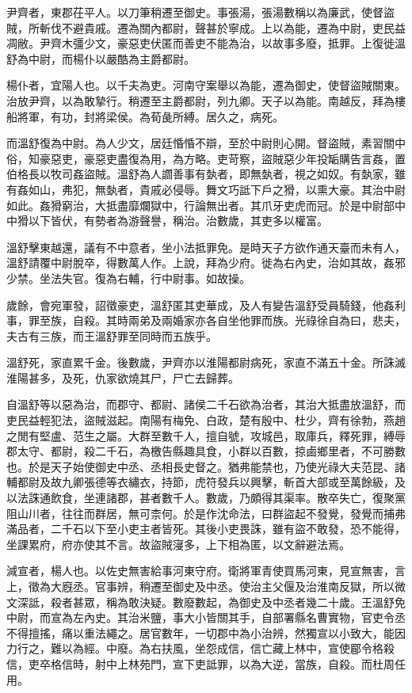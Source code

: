 尹齊者，東郡茌平人。以刀筆稍遷至御史。事張湯，張湯數稱以為廉武，使督盜賊，所斬伐不避貴戚。遷為關內都尉，聲甚於寧成。上以為能，遷為中尉，吏民益凋敝。尹齊木彊少文，豪惡吏伏匿而善吏不能為治，以故事多廢，抵罪。上復徙溫舒為中尉，而楊仆以嚴酷為主爵都尉。

楊仆者，宜陽人也。以千夫為吏。河南守案舉以為能，遷為御史，使督盜賊關東。治放尹齊，以為敢摯行。稍遷至主爵都尉，列九卿。天子以為能。南越反，拜為樓船將軍，有功，封將梁侯。為荀彘所縛。居久之，病死。

而溫舒復為中尉。為人少文，居廷惛惛不辯，至於中尉則心開。督盜賊，素習關中俗，知豪惡吏，豪惡吏盡復為用，為方略。吏苛察，盜賊惡少年投缿購告言姦，置伯格長以牧司姦盜賊。溫舒為人讇善事有埶者，即無埶者，視之如奴。有埶家，雖有姦如山，弗犯，無埶者，貴戚必侵辱。舞文巧詆下戶之猾，以熏大豪。其治中尉如此。姦猾窮治，大抵盡靡爛獄中，行論無出者。其爪牙吏虎而冠。於是中尉部中中猾以下皆伏，有勢者為游聲譽，稱治。治數歲，其吏多以權富。

溫舒擊東越還，議有不中意者，坐小法抵罪免。是時天子方欲作通天臺而未有人，溫舒請覆中尉脫卒，得數萬人作。上說，拜為少府。徙為右內史，治如其故，姦邪少禁。坐法失官。復為右輔，行中尉事。如故操。

歲餘，會宛軍發，詔徵豪吏，溫舒匿其吏華成，及人有變告溫舒受員騎錢，他姦利事，罪至族，自殺。其時兩弟及兩婚家亦各自坐他罪而族。光祿徐自為曰，悲夫，夫古有三族，而王溫舒罪至同時而五族乎。

溫舒死，家直累千金。後數歲，尹齊亦以淮陽都尉病死，家直不滿五十金。所誅滅淮陽甚多，及死，仇家欲燒其尸，尸亡去歸葬。

自溫舒等以惡為治，而郡守、都尉、諸侯二千石欲為治者，其治大抵盡放溫舒，而吏民益輕犯法，盜賊滋起。南陽有梅免、白政，楚有殷中、杜少，齊有徐勃，燕趙之閒有堅盧、范生之屬。大群至數千人，擅自號，攻城邑，取庫兵，釋死罪，縛辱郡太守、都尉，殺二千石，為檄告縣趣具食，小群以百數，掠鹵鄉里者，不可勝數也。於是天子始使御史中丞、丞相長史督之。猶弗能禁也，乃使光祿大夫范昆、諸輔都尉及故九卿張德等衣繡衣，持節，虎符發兵以興擊，斬首大部或至萬餘級，及以法誅通飲食，坐連諸郡，甚者數千人。數歲，乃頗得其渠率。散卒失亡，復聚黨阻山川者，往往而群居，無可柰何。於是作沈命法，曰群盜起不發覺，發覺而捕弗滿品者，二千石以下至小吏主者皆死。其後小吏畏誅，雖有盜不敢發，恐不能得，坐課累府，府亦使其不言。故盜賊寖多，上下相為匿，以文辭避法焉。

減宣者，楊人也。以佐史無害給事河東守府。衛將軍青使買馬河東，見宣無害，言上，徵為大廐丞。官事辨，稍遷至御史及中丞。使治主父偃及治淮南反獄，所以微文深詆，殺者甚眾，稱為敢決疑。數廢數起，為御史及中丞者幾二十歲。王溫舒免中尉，而宣為左內史。其治米鹽，事大小皆關其手，自部署縣名曹實物，官吏令丞不得擅搖，痛以重法繩之。居官數年，一切郡中為小治辨，然獨宣以小致大，能因力行之，難以為經。中廢。為右扶風，坐怨成信，信亡藏上林中，宣使郿令格殺信，吏卒格信時，射中上林苑門，宣下吏詆罪，以為大逆，當族，自殺。而杜周任用。

